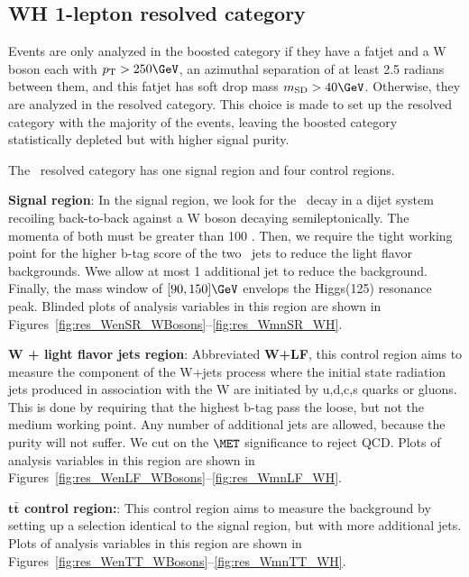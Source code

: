 \subsection{WH 1-lepton resolved category}
Events are only analyzed in the boosted category if they have a fatjet and a W boson each with $\pt > 250 \GeV$,
an azimuthal separation of at least 2.5 radians between them, and this fatjet has soft drop mass $\msd > 40 \GeV$.
Otherwise, they are analyzed in the resolved category.
This choice is made to set up the resolved category with the majority of the events,
leaving the boosted category statistically depleted but with higher signal purity.

The \WlnH\ resolved category has one signal region and four control regions.

\textbf{Signal region}: In the signal region, we look for the \HBB\ decay in a dijet system recoiling
back-to-back against a W boson decaying semileptonically. The momenta of both must be greater than 100 \GeV.
Then, we require the tight working point for the higher b-tag score of the two \HBB\ jets to reduce the light flavor backgrounds.
Wwe allow at most 1 additional jet to reduce the \ttbar background.
Finally, the mass window of $[90,150] \GeV$ envelops the Higgs(125) resonance peak.
Blinded plots of analysis variables in this region are shown in Figures~\ref{fig:res_WenSR_WBosons}--\ref{fig:res_WmnSR_WH}.

\textbf{W + light flavor jets region}: Abbreviated \textbf{W+LF}, this control region aims to measure the component of the
W+jets process where the initial state radiation jets produced in association with the W are initiated by u,d,c,s quarks or gluons.
This is done by requiring that the highest b-tag pass the loose, but not the medium working point.
Any number of additional jets are allowed, because the purity will not suffer.
We cut on the $\MET$ significance to reject QCD.
Plots of analysis variables in this region are shown in Figures~\ref{fig:res_WenLF_WBosons}--\ref{fig:res_WmnLF_WH}.

\textbf{$\mathbf{t\bar{t}}$ control region:}: This control region aims to measure the \ttbar background by setting up
a selection identical to the signal region, but with more additional jets.
Plots of analysis variables in this region are shown in Figures~\ref{fig:res_WenTT_WBosons}--\ref{fig:res_WmnTT_WH}.


